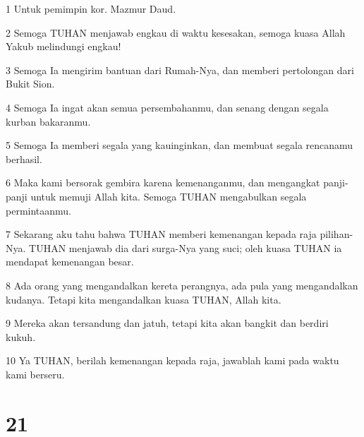 \par 1 Untuk pemimpin kor. Mazmur Daud.
\par 2 Semoga TUHAN menjawab engkau di waktu kesesakan, semoga kuasa Allah Yakub melindungi engkau!
\par 3 Semoga Ia mengirim bantuan dari Rumah-Nya, dan memberi pertolongan dari Bukit Sion.
\par 4 Semoga Ia ingat akan semua persembahanmu, dan senang dengan segala kurban bakaranmu.
\par 5 Semoga Ia memberi segala yang kauinginkan, dan membuat segala rencanamu berhasil.
\par 6 Maka kami bersorak gembira karena kemenanganmu, dan mengangkat panji-panji untuk memuji Allah kita. Semoga TUHAN mengabulkan segala permintaanmu.
\par 7 Sekarang aku tahu bahwa TUHAN memberi kemenangan kepada raja pilihan-Nya. TUHAN menjawab dia dari surga-Nya yang suci; oleh kuasa TUHAN ia mendapat kemenangan besar.
\par 8 Ada orang yang mengandalkan kereta perangnya, ada pula yang mengandalkan kudanya. Tetapi kita mengandalkan kuasa TUHAN, Allah kita.
\par 9 Mereka akan tersandung dan jatuh, tetapi kita akan bangkit dan berdiri kukuh.
\par 10 Ya TUHAN, berilah kemenangan kepada raja, jawablah kami pada waktu kami berseru.

\chapter{21}

